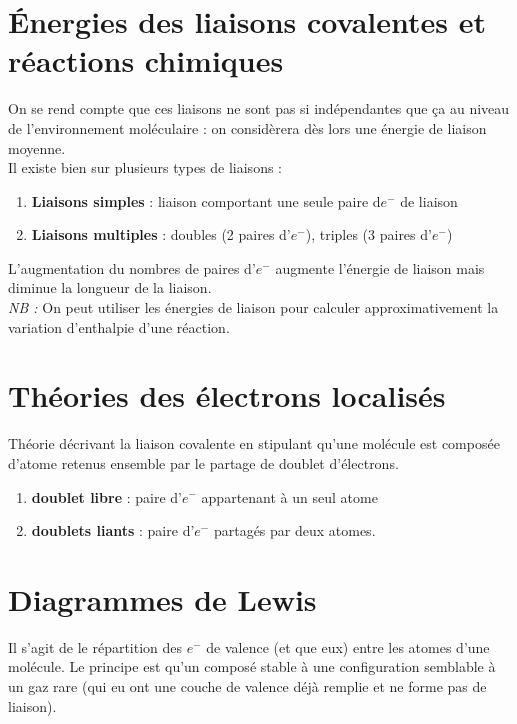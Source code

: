 \documentclass	[11pt, a4paper, openany]{book}
\begin{document}
\section{Énergies des liaisons covalentes et réactions chimiques}
On se rend compte que ces liaisons ne sont pas si indépendantes que ça au niveau de l'environnement moléculaire : on considèrera dès lors une énergie de liaison moyenne.\\
Il existe bien sur plusieurs types de liaisons : 
\begin{enumerate}
	\item \textbf{Liaisons simples} : liaison comportant une seule paire d$e^-$ de liaison
	\item \textbf{Liaisons multiples} : doubles (2 paires d'$e^-$), triples (3 paires d'$e^-$)
\end{enumerate}
L'augmentation du nombres de paires d'$e^-$ augmente l'énergie de liaison mais diminue la longueur de la liaison.\\
\textit{NB : } On peut utiliser les énergies de liaison pour calculer approximativement la variation d'enthalpie d'une réaction.

\section{Théories des électrons localisés}
Théorie décrivant la liaison covalente en stipulant qu'une molécule est composée d'atome retenus ensemble par le partage de doublet d'électrons. 
\begin{enumerate}
	\item \textbf{doublet libre} : paire d'$e^-$ appartenant à un seul atome
	\item \textbf{doublets liants} : paire d'$e^-$ partagés par deux atomes.
\end{enumerate}

\section{Diagrammes de Lewis}
Il s'agit de le répartition des $e^-$ de valence (et que eux) entre les atomes d'une molécule. Le principe est qu'un composé stable à une configuration semblable à un gaz rare (qui eu ont une couche de valence déjà remplie et ne forme pas de liaison).\\
\end{document}
